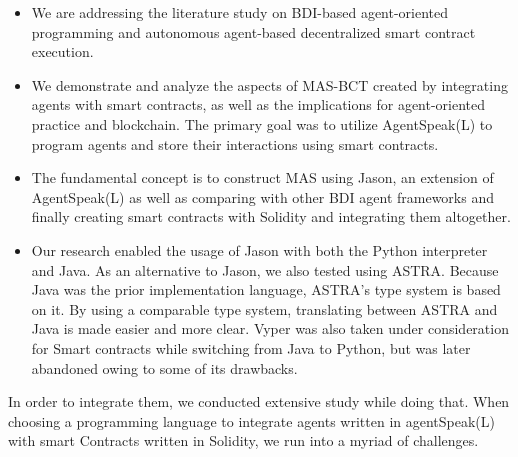 \begin{itemize}
    \item We are addressing the literature study on \ac{BDI}-based agent-oriented programming and autonomous agent-based decentralized smart contract execution.

    \item We demonstrate and analyze the aspects of \ac{MAS}-\ac{BCT} created by integrating agents with smart contracts, as well as the implications for agent-oriented practice and blockchain. The primary goal was to utilize AgentSpeak(L) to program agents and store their interactions using smart contracts.
    
\vspace{.5cm}

    \item  The fundamental concept is to construct \ac{MAS} using Jason, an extension of AgentSpeak(L) as well as comparing with other \ac{BDI} agent frameworks and finally creating smart contracts with Solidity and integrating them altogether.
    
\vspace{.5cm}

    \item Our research enabled the usage of Jason with both the Python interpreter and Java. As an alternative to Jason, we also tested using ASTRA. Because Java was the prior implementation language, ASTRA's type system is based on it. By using a comparable type system, translating between ASTRA and Java is made easier and more clear. Vyper was also taken under consideration for Smart contracts while switching from Java to Python, but was later abandoned owing to some of its drawbacks.
    
\vspace{.5cm}

\end{itemize}

In order to integrate them, we conducted extensive study while doing that. When choosing a programming language to integrate agents written in agentSpeak(L) with smart Contracts written in Solidity, we run into a myriad of challenges.


